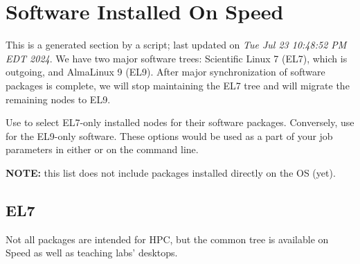 \section{Software Installed On Speed}
\label{sect:software-details}

This is a generated section by a script; last updated on \textit{Tue Jul 23 10:48:52 PM EDT 2024}.
We have two major software trees: Scientific Linux 7 (EL7), which is
outgoing, and AlmaLinux 9 (EL9). After major synchronization of software
packages is complete, we will stop maintaining the EL7 tree and
will migrate the remaining nodes to EL9.

Use  to select EL7-only installed nodes for their
software packages. Conversely, use  for the EL9-only
software. These options would be used as a part of your job parameters
in either  or on the command line.

\noindent
\textbf{NOTE:} this list does not include packages installed directly on the OS (yet).

\subsection{EL7}
\label{sect:software-el7}

Not all packages are intended for HPC, but the common tree is available
on Speed as well as teaching labs' desktops.

